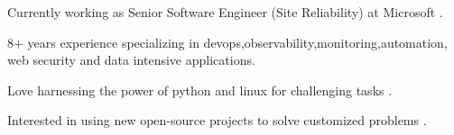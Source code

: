 

\begin{cvparagraph}

Currently working as Senior Software Engineer (Site Reliability) at Microsoft .

 8+ years experience specializing in devops,observability,monitoring,automation, web security and data intensive applications.

 Love harnessing the power of python and linux for challenging tasks .

 Interested in using new open-source projects to solve customized problems .
\end{cvparagraph}
